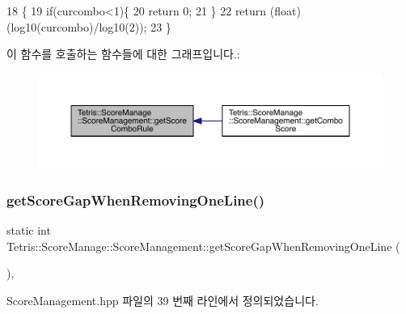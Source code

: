 \begin{DoxyCode}
18                                                               \{
19                     \textcolor{keywordflow}{if}(curcombo<1)\{
20                         \textcolor{keywordflow}{return} 0;
21                     \}
22                     \textcolor{keywordflow}{return} (\textcolor{keywordtype}{float})(log10(curcombo)/log10(2));
23                 \}
\end{DoxyCode}
이 함수를 호출하는 함수들에 대한 그래프입니다.\+:
\nopagebreak
\begin{figure}[H]
\begin{center}
\leavevmode
\includegraphics[width=350pt]{d9/d94/class_tetris_1_1_score_manage_1_1_score_management_a41c245dcf773c6c677c2e31f6ac17944_icgraph}
\end{center}
\end{figure}
\mbox{\label{class_tetris_1_1_score_manage_1_1_score_management_a2991c1eb0595da71788aba706e0b27b7}} 
\subsubsection{\texorpdfstring{get\+Score\+Gap\+When\+Removing\+One\+Line()}{getScoreGapWhenRemovingOneLine()}}
{\footnotesize\ttfamily static int Tetris\+::\+Score\+Manage\+::\+Score\+Management\+::get\+Score\+Gap\+When\+Removing\+One\+Line (\begin{DoxyParamCaption}{ }\end{DoxyParamCaption})\hspace{0.3cm}{\ttfamily [inline]}, {\ttfamily [static]}}



Score\+Management.\+hpp 파일의 39 번째 라인에서 정의되었습니다.


